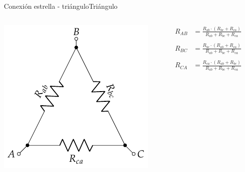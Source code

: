 \documentclass[aspectratio=169, xcolor={usenames,svgnames,dvipsnames}]{beamer}
\begin{document}
\begin{frame}
{Conexión estrella - triángulo}{Triángulo}
\begin{columns}
\begin{column}{0.5\columnwidth}
\begin{center}
\includegraphics[width=.9\linewidth]{../figs/Conexion_Triangulo.pdf}
\end{center}
\end{column}
\begin{column}{0.5\columnwidth}
\begin{align*}
  R_{AB} &= \frac{R_{ab} \cdot (R_{bc} + R_{ca})}{R_{ab} + R_{bc} + R_{ca}}\\
  \\
  R_{BC} &= \frac{R_{bc} \cdot (R_{ab} + R_{ca})}{R_{ab} + R_{bc} + R_{ca}}\\
  \\
  R_{CA} &= \frac{R_{ca} \cdot (R_{ab} + R_{bc})}{R_{ab} + R_{bc} + R_{ca}}
\end{align*}
\end{column}
\end{columns}
\end{frame}
\end{document}
